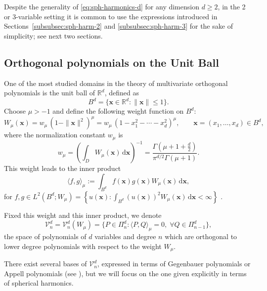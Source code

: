 \documentclass[a4paper]{article}
\theoremstyle{plain}
\theoremstyle{definition}
\newcommand{\RR}{\mathbb{R}}
\newcommand{\dr}{\mathrm{d}}
\newcommand{\innerprod}[2]{\langle #1 , #2 \rangle}
\begin{document}
    Despite the generality of \eqref{eq:sph-harmonics-d} for any dimension $d\geq 2$, in the 2 or 3-variable setting it is common to use the expressions introduced in Sections~\ref{subsubsec:sph-harm-2} and \ref{subsubsec:sph-harm-3} for the sake of simplicity; see next two sections.

    
    \subsection{Orthogonal polynomials on the Unit Ball}

    One of the most studied domains in the theory of multivariate orthogonal polynomials is the unit ball of $\RR^d$, defined as
    \begin{equation}
        \label{eq:d-Ball}B^d = \{\mathbf x\in\RR^d:\|\mathbf x\|\leq 1\}.
    \end{equation}
    Choose $\mu>-1$ and define the following weight function on $B^d$:
    \begin{equation}
        \label{eq:weight-ball-d}
        W_\mu(\mathbf x)=w_\mu\,(1-\|\mathbf x\|^2)^{\mu}=w_\mu\,(1-x_1^2-\cdots-x_d^2)^\mu, \qquad \mathbf x = (x_1,\dots,x_d)\in B^d,
    \end{equation}
    where the normalization constant $w_\mu$ is 
    $$
    w_\mu= \left(\int_D W_\mu(\mathbf x)\, \dr\mathbf x\right)^{-1} = \frac{\Gamma(\mu+1+\frac{d}{2})}{\pi^{d/2}\Gamma(\mu+1)}.
    $$
    This weight leads to the inner product
    \begin{equation}
    \label{eq:inner-prod-d}
        \innerprod{f}{g}_\mu:=\int_{B^d}f(\mathbf x)g(\mathbf x)W_\mu(\mathbf x)\,\dr \mathbf x,
    \end{equation}
    for $f,g\in L^2(B^d;W_\mu)=\left\{ u(\mathbf x): \int_{B^d} (u(\mathbf x))^2W_\mu(\mathbf x)\,\dr \mathbf x<\infty\right\}$ \cite[Section 5.2]{DX14}.
  
    Fixed this weight and this inner product, we denote 
    $$
    \mathcal V_n^d=\mathcal V_n^d(W_\mu)=\{P\in\Pi_n^d:\innerprod{P}{Q}_{\mu}=0,\; \forall Q\in \Pi_{n-1}^d\}, 
    $$
    the space of polynomials of $d$ variables and degree $n$ which are orthogonal to lower degree polynomials with respect to the weight $W_\mu$.

    There exist several bases of $\mathcal V_n^d$, expressed in terms of Gegenbauer polynomials or Appell polynomials (see \cite[Sections 5.2.1, 5.2.2]{DX14}), but we will focus on the one given explicitly in terms of spherical harmonics. 
    
\end{document}
